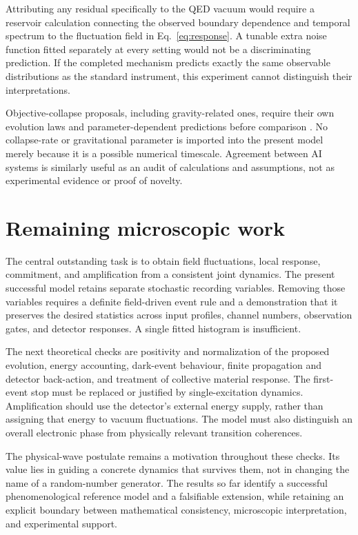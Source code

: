 \documentclass[11pt]{article}
\begin{document}
Attributing any residual specifically to the QED vacuum would require a reservoir calculation connecting the observed boundary dependence and temporal spectrum to the fluctuation field in Eq.~\eqref{eq:response}. A tunable extra noise function fitted separately at every setting would not be a discriminating prediction. If the completed mechanism predicts exactly the same observable distributions as the standard instrument, this experiment cannot distinguish their interpretations.

Objective-collapse proposals, including gravity-related ones, require their own evolution laws and parameter-dependent predictions before comparison \cite{bassi}. No collapse-rate or gravitational parameter is imported into the present model merely because it is a possible numerical timescale. Agreement between AI systems is similarly useful as an audit of calculations and assumptions, not as experimental evidence or proof of novelty.

\section{Remaining microscopic work}
The central outstanding task is to obtain field fluctuations, local response, commitment, and amplification from a consistent joint dynamics. The present successful model retains separate stochastic recording variables. Removing those variables requires a definite field-driven event rule and a demonstration that it preserves the desired statistics across input profiles, channel numbers, observation gates, and detector responses. A single fitted histogram is insufficient.

The next theoretical checks are positivity and normalization of the proposed evolution, energy accounting, dark-event behaviour, finite propagation and detector back-action, and treatment of collective material response. The first-event stop must be replaced or justified by single-excitation dynamics. Amplification should use the detector's external energy supply, rather than assigning that energy to vacuum fluctuations. The model must also distinguish an overall electronic phase from physically relevant transition coherences.

The physical-wave postulate remains a motivation throughout these checks. Its value lies in guiding a concrete dynamics that survives them, not in changing the name of a random-number generator. The results so far identify a successful phenomenological reference model and a falsifiable extension, while retaining an explicit boundary between mathematical consistency, microscopic interpretation, and experimental support.
\end{document}
